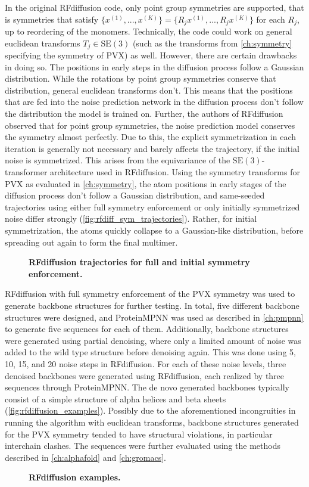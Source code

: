 In the original RFdiffusion code, only point group symmetries are supported, that is symmetries that satisfy $\{x^{(1)}, ..., x^{(K)}\} = \{R_j x^{(1)}, ..., R_j x^{(K)}\}$ for each $R_j$, up to reordering of the monomers. Technically, the code could work on general euclidean transforms $T_j \in \mathrm{SE}(3)$ (such as the transforms from \autoref{ch:symmetry} specifying the symmetry of PVX) as well. However, there are certain drawbacks in doing so. The positions in early steps in the diffusion process follow a Gaussian distribution. While the rotations by point group symmetries conserve that distribution, general euclidean transforms don't. This means that the positions that are fed into the noise prediction network in the diffusion process don't follow the distribution the model is trained on. Further, the authors of RFdiffusion observed that for point group symmetries, the noise prediction model conserves the symmetry almost perfectly. Due to this, the explicit symmetrization in each iteration is generally not necessary and barely affects the trajectory, if the initial noise is symmetrized. This arises from the equivariance of the $\mathrm{SE}(3)$-transformer architecture used in RFdiffusion. Using the symmetry transforms for PVX as evaluated in \autoref{ch:symmetry}, the atom positions in early stages of the diffusion process don't follow a Gaussian distribution, and same-seeded trajectories using either full symmetry enforcement or only initially symmetrized noise differ strongly (\autoref{fig:rfdiff_sym_trajectories}). Rather, for initial symmetrization, the atoms quickly collapse to a Gaussian-like distribution, before spreading out again to form the final multimer.

\begin{figure}[!hbtp]
    \centering
    
    \caption{\textbf{RFdiffusion trajectories for full and initial symmetry enforcement. }}
    \label{fig:rfdiff_sym_trajectories}
\end{figure}

\FloatBarrier

RFdiffusion with full symmetry enforcement of the PVX symmetry was used to generate backbone structures for further testing. In total, five different backbone structures were designed, and ProteinMPNN was used as described in \autoref{ch:pmpnn} to generate five sequences for each of them. Additionally, backbone structures were generated using partial denoising, where only a limited amount of noise was added to the wild type structure before denoising again. This was done using 5, 10, 15, and 20 noise steps in RFdiffusion. For each of these noise levels, three denoised backbones were generated using RFdiffusion, each realized by three sequences through ProteinMPNN. The de novo generated backbones typically consist of a simple structure of alpha helices and beta sheets (\autoref{fig:rfdiffusion_examples}). Possibly due to the aforementioned incongruities in running the algorithm with euclidean transforms, backbone structures generated for the PVX symmetry tended to have structural violations, in particular interchain clashes. The sequences were further evaluated using the methods described in \autoref{ch:alphafold} and \autoref{ch:gromacs}.


\begin{figure}
\centering

\caption{\textbf{RFdiffusion examples. }}
\label{fig:rfdiffusion_examples}
\end{figure}

